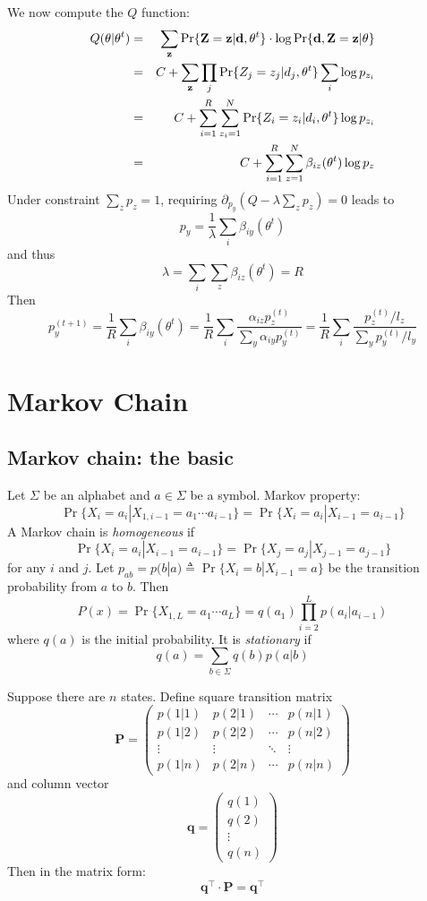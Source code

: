 \documentclass[10pt]{article}
\begin{document}
We now compute the $Q$ function:
\begin{eqnarray*}
Q(\theta|\theta^t)&=&\sum_{{\bf z}}\Pr\{{\bf Z}={\bf z}|{\bf d},\theta^t\}\cdot\log\Pr\{{\bf d},{\bf Z}={\bf z}|\theta\}\\
&=&C+\sum_{{\bf z}}\prod_j\Pr\{Z_j=z_j|d_j,\theta^t\}\sum_i\log p_{z_i}\\
&=&C+\sum_{i=1}^R\sum_{z_i=1}^N\Pr\{Z_i=z_i|d_i,\theta^t\}\log p_{z_i}\\
&=&C+\sum_{i=1}^R\sum_{z=1}^N\beta_{iz}(\theta^t)\log p_z
\end{eqnarray*}
Under constraint $\sum_zp_z=1$, requiring
$\partial_{p_y}(Q-\lambda\sum_zp_z)=0$ leads to
\[
p_y=\frac{1}{\lambda}\sum_i\beta_{iy}(\theta^t)
\]
and thus
\[
\lambda=\sum_i\sum_z\beta_{iz}(\theta^t)=R
\]
Then
\[
p_y^{(t+1)}=\frac{1}{R}\sum_i\beta_{iy}(\theta^t)=\frac{1}{R}\sum_i\frac{\alpha_{iz}p^{(t)}_z}{\sum_{y}\alpha_{iy}p^{(t)}_y}=\frac{1}{R}\sum_i\frac{p_z^{(t)}/l_z}{\sum_yp_y^{(t)}/l_y}
\]

\newpage

\section{Markov Chain}

\subsection{Markov chain: the basic}
Let $\Sigma$ be an alphabet and $a\in\Sigma$ be a symbol. Markov property:
$$
\Pr\{X_i=a_i|X_{1,i-1}=a_1\cdots a_{i-1}\}=\Pr\{X_i=a_i|X_{i-1}=a_{i-1}\}
$$
A Markov chain is \emph{homogeneous} if
$$
\Pr\{X_i=a_i|X_{i-1}=a_{i-1}\}=\Pr\{X_j=a_j|X_{j-1}=a_{j-1}\}
$$
for any $i$ and $j$. Let $p_{ab}=p(b|a)\triangleq\Pr\{X_i=b|X_{i-1}=a\}$ be the
transition probability from $a$ to $b$. Then
$$
P(x)=\Pr\{X_{1,L}=a_1\cdots a_L\}=q(a_1)\prod_{i=2}^Lp(a_i|a_{i-1})
$$
where $q(a)$ is the initial probability. It is \emph{stationary} if
$$
q(a)=\sum_{b\in\Sigma} q(b)p(a|b)
$$

Suppose there are $n$ states. Define square transition matrix
$$
\mathbf{P}=\left(\begin{array}{cccc}
p(1|1) & p(2|1) & \cdots & p(n|1) \\
p(1|2) & p(2|2) & \cdots & p(n|2) \\
\vdots & \vdots & \ddots & \vdots \\
p(1|n) & p(2|n) & \cdots & p(n|n)
\end{array}\right)
$$
and column vector
$$
\mathbf{q}=\left(\begin{array}{c}
q(1) \\
q(2) \\
\vdots\\
q(n)
\end{array}\right)
$$
Then in the matrix form:
$$
\mathbf{q}^\intercal\cdot\mathbf{P}=\mathbf{q}^\intercal
$$
\end{document}
